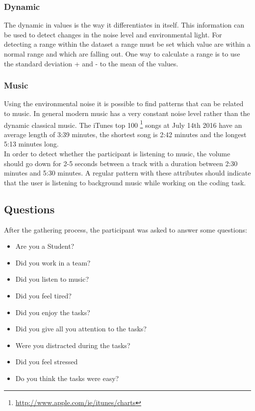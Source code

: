 {\subsubsection{Dynamic}
The dynamic in values is the way it differentiates in itself. This information can be used to detect changes in the noise level and environmental light. For detecting a range within the dataset a range must be set which value are within a normal range and which are falling out. One way to calculate a range is to use the standard deviation + and - to the mean of the values. 

\subsubsection{Music}
Using the environmental noise it is possible to find patterns that can be related to music. In general modern music has a very constant noise level rather than the dynamic classical music. The iTunes top 100 \footnote{\url{http://www.apple.com/ie/itunes/charts}} songs at July 14th 2016 have an average length of 3:39 minutes, the shortest song is 2:42 minutes and the longest 5:13 minutes long.\\
In order to detect whether the participant is listening to music, the volume should go down for 2-5 seconds between a track with a duration between 2:30 minutes and 5:30 minutes. 
A regular pattern with these attributes should indicate that the user is listening to background music while working on the coding task.

\subsection{Questions}
After the gathering process, the participant was asked to answer some questions:
\begin{itemize}
\item Are you a Student?
\item Did you work in a team?
\item Did you listen to music?
\item Did you feel tired?
\item Did you enjoy the tasks?
\item Did you give all you attention to the tasks?
\item Were you distracted during the tasks?
\item Did you feel stressed
\item Do you think the tasks were easy?
\end{itemize}

}
